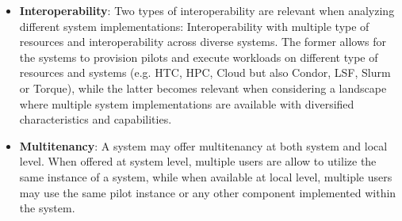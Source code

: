 \documentclass{sig-alternate}
\begin{document}
\begin{itemize}
\item \textbf{Interoperability}: Two types of interoperability are
  relevant when analyzing different \pilot system implementations:
  Interoperability with multiple type of resources and
  interoperability across diverse \pilot systems. The former allows
  for the \pilot systems to provision pilots and execute workloads on
  different type of resources and systems (e.g. HTC, HPC, Cloud but
  also Condor, LSF, Slurm or Torque), while the latter becomes
  relevant when considering a landscape where multiple \pilot system
  implementations are available with diversified characteristics and
  capabilities.


\item \textbf{Multitenancy}: A \pilot system may offer multitenancy
  at both system and local level. When offered at system level,
  multiple users are allow to utilize the same instance of a \pilot
  system, while when available at local level, multiple users may use
  the same pilot instance or any other component implemented within the
  \pilot system.


\end{itemize}
\end{document}
